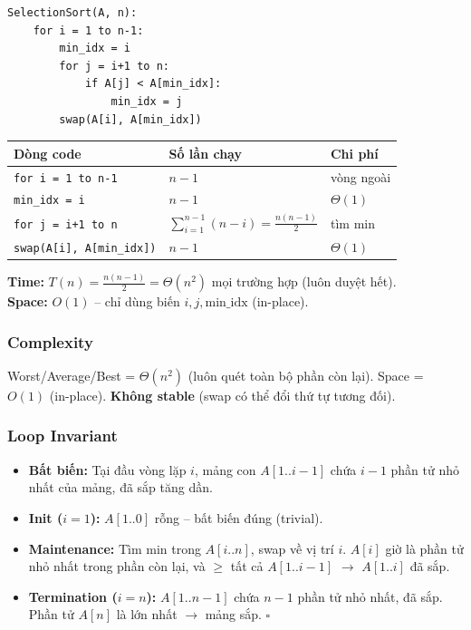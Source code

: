 \documentclass[10pt]{article}
\providecommand{\tightlist}{\setlength{\itemsep}{0pt}\setlength{\parskip}{0pt}}
\begin{document}
\begin{tcolorbox}[colback=gray!8, colframe=gray!50, boxrule=0.5pt, arc=2pt,
  left=6pt, right=6pt, top=4pt, bottom=4pt,
  title={\small\textbf{Pseudocode 3b: Selection Sort}}]
\begin{verbatim}
SelectionSort(A, n):
    for i = 1 to n-1:
        min_idx = i
        for j = i+1 to n:
            if A[j] < A[min_idx]:
                min_idx = j
        swap(A[i], A[min_idx])
\end{verbatim}
\end{tcolorbox}

\begin{tcolorbox}[colback=yellow!5, colframe=orange!50, boxrule=0.5pt, arc=2pt, title={\small\textbf{Phân tích Complexity -- Selection Sort}}]
\begin{tabular}{|l|l|l|}
\hline
\textbf{Dòng code} & \textbf{Số lần chạy} & \textbf{Chi phí} \\
\hline
\texttt{for i = 1 to n-1} & $n-1$ & vòng ngoài \\
\hline
\quad \texttt{min\_idx = i} & $n-1$ & $\Theta(1)$ \\
\hline
\quad \texttt{for j = i+1 to n} & $\sum_{i=1}^{n-1}(n-i)=\frac{n(n-1)}{2}$ & tìm min \\
\hline
\quad \texttt{swap(A[i], A[min\_idx])} & $n-1$ & $\Theta(1)$ \\
\hline
\end{tabular}
\vspace{0.2cm}

\textbf{Time:} $T(n)=\frac{n(n-1)}{2}=\Theta(n^2)$ mọi trường hợp (luôn duyệt hết).\\
\textbf{Space:} $O(1)$ -- chỉ dùng biến $i, j, \text{min\_idx}$ (in-place).
\end{tcolorbox}

\subsubsection{Complexity}
Worst/Average/Best = $\Theta(n^2)$ (luôn quét toàn bộ phần còn lại). Space = $O(1)$ (in-place). \textbf{Không stable} (swap có thể đổi thứ tự tương đối).

\subsubsection{Loop Invariant}
\begin{itemize}
\tightlist
\item \textbf{Bất biến:} Tại đầu vòng lặp $i$, mảng con $A[1..i{-}1]$ chứa $i{-}1$ phần tử nhỏ nhất của mảng, đã sắp tăng dần.
\item \textbf{Init ($i=1$):} $A[1..0]$ rỗng -- bất biến đúng (trivial).
\item \textbf{Maintenance:} Tìm min trong $A[i..n]$, swap về vị trí $i$. $A[i]$ giờ là phần tử nhỏ nhất trong phần còn lại, và $\geq$ tất cả $A[1..i{-}1]$ $\to$ $A[1..i]$ đã sắp.
\item \textbf{Termination ($i=n$):} $A[1..n{-}1]$ chứa $n{-}1$ phần tử nhỏ nhất, đã sắp. Phần tử $A[n]$ là lớn nhất $\to$ mảng sắp. $\square$
\end{itemize}
\end{document}
